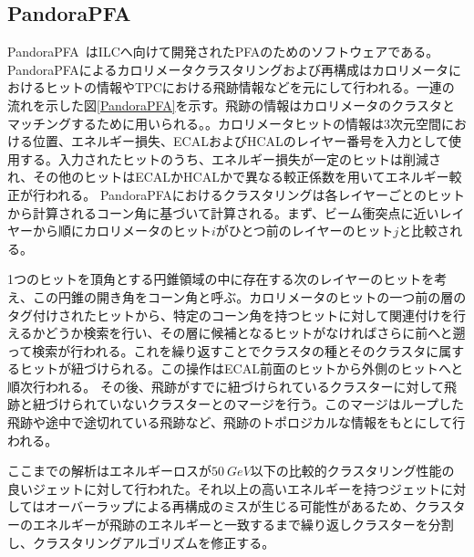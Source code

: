 \subsection{PandoraPFA}
PandoraPFA~\cite{PandoraPFA}はILCへ向けて開発されたPFAのためのソフトウェアである。PandoraPFAによるカロリメータクラスタリングおよび再構成はカロリメータにおけるヒットの情報やTPCにおける飛跡情報などを元にして行われる。一連の流れを示した図\ref{PandoraPFA}を示す。飛跡の情報はカロリメータのクラスタとマッチングするために用いられる。。カロリメータヒットの情報は3次元空間における位置、エネルギー損失、ECALおよびHCALのレイヤー番号を入力として使用する。入力されたヒットのうち、エネルギー損失が一定のヒットは削減され、その他のヒットはECALかHCALかで異なる較正係数を用いてエネルギー較正が行われる。%
PandoraPFAにおけるクラスタリングは各レイヤーごとのヒットから計算されるコーン角に基づいて計算される。まず、ビーム衝突点に近いレイヤーから順にカロリメータのヒット$i$がひとつ前のレイヤーのヒット$j$と比較される。

1つのヒットを頂角とする円錐領域の中に存在する次のレイヤーのヒットを考え、この円錐の開き角をコーン角と呼ぶ。カロリメータのヒットの一つ前の層のタグ付けされたヒットから、特定のコーン角を持つヒットに対して関連付けを行えるかどうか検索を行い、その層に候補となるヒットがなければさらに前へと遡って検索が行われる。これを繰り返すことでクラスタの種とそのクラスタに属するヒットが紐づけられる。この操作はECAL前面のヒットから外側のヒットへと順次行われる。
その後、飛跡がすでに紐づけられているクラスターに対して飛跡と紐づけられていないクラスターとのマージを行う。このマージはループした飛跡や途中で途切れている飛跡など、飛跡のトポロジカルな情報をもとにして行われる。

ここまでの解析はエネルギーロスが$\SI{50}{GeV}$以下の比較的クラスタリング性能の良いジェットに対して行われた。それ以上の高いエネルギーを持つジェットに対してはオーバーラップによる再構成のミスが生じる可能性があるため、クラスターのエネルギーが飛跡のエネルギーと一致するまで繰り返しクラスターを分割し、クラスタリングアルゴリズムを修正する。

